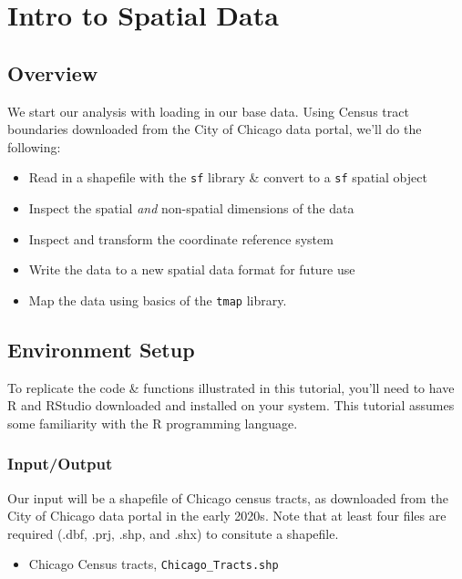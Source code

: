 \documentclass[
  letterpaper,
  DIV=11,
  numbers=noendperiod]{scrreprt}
\providecommand{\tightlist}{%
  \setlength{\itemsep}{0pt}\setlength{\parskip}{0pt}}
\begin{document}

\chapter{Intro to Spatial Data}\label{intro}

\section{Overview}\label{overview}

We start our analysis with loading in our base data. Using Census tract
boundaries downloaded from the City of Chicago data portal, we'll do the
following:

\begin{itemize}
\tightlist
\item
  Read in a shapefile with the \texttt{sf} library \& convert to a
  \texttt{sf} spatial object
\item
  Inspect the spatial \emph{and} non-spatial dimensions of the data
\item
  Inspect and transform the coordinate reference system
\item
  Write the data to a new spatial data format for future use
\item
  Map the data using basics of the \texttt{tmap} library.
\end{itemize}

\section{Environment Setup}\label{BA-setup}

To replicate the code \& functions illustrated in this tutorial, you'll
need to have R and RStudio downloaded and installed on your system. This
tutorial assumes some familiarity with the R programming language.

\subsection{Input/Output}\label{BA-i-o}

Our input will be a shapefile of Chicago census tracts, as downloaded
from the City of Chicago data portal in the early 2020s. Note that at
least four files are required (.dbf, .prj, .shp, and .shx) to consitute
a shapefile.

\begin{itemize}
\tightlist
\item
  Chicago Census tracts, \texttt{Chicago\_Tracts.shp}
\end{itemize}
\end{document}
